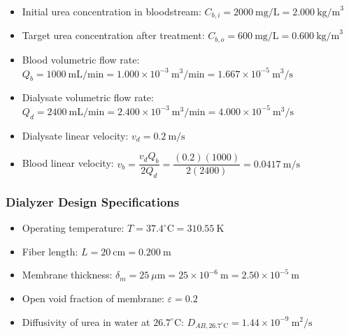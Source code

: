 \documentclass[10.5pt]{article}
\begin{document}
\vspace{-0.2cm}
\begin{itemize}
    \setlength\itemsep{-0.15cm}

    \item Initial urea concentration in bloodstream: 
    \(C_{b,i} = 2000 \ \text{mg/L} = 2.000 \ \text{kg/m}^3\)

    \item Target urea concentration after treatment: 
    \(C_{b,o} = 600 \ \text{mg/L} = 0.600 \ \text{kg/m}^3\)

    \item Blood volumetric flow rate: 
    \(Q_b = 1000 \ \text{mL/min} = 1.000 \times 10^{-3} \ \text{m}^3/\text{min}
    = 1.667 \times 10^{-5} \ \text{m}^3/\text{s}\)

    \item Dialysate volumetric flow rate: 
    \(Q_d = 2400 \ \text{mL/min} = 2.400 \times 10^{-3} \ \text{m}^3/\text{min}
    = 4.000 \times 10^{-5} \ \text{m}^3/\text{s}\)

    \item Dialysate linear velocity: 
    \(v_d = 0.2 \ \text{m/s}\)

    \item Blood linear velocity: 
    \(v_b = \dfrac{v_d Q_b}{2Q_d}
    = \dfrac{(0.2)(1000)}{2(2400)}
    = 0.0417 \ \text{m/s}\)
\end{itemize}

\vspace{-0.4cm}
\subsubsection{Dialyzer Design Specifications}

\vspace{-0.2cm}
\begin{itemize}
    \setlength\itemsep{-0.15cm}

    \item Operating temperature: 
    \(T = 37.4^\circ \text{C} = 310.55 \ \text{K}\)

    \item Fiber length: 
    \(L = 20 \ \text{cm} = 0.200 \ \text{m}\)

    \item Membrane thickness: 
    \(\delta_m = 25 \ \mu\text{m} = 25 \times 10^{-6} \ \text{m}
    = 2.50 \times 10^{-5} \ \text{m}\)

    \item Open void fraction of membrane: 
    \(\varepsilon = 0.2\)

    \item Diffusivity of urea in water at \(26.7^\circ \text{C}\): 
    \(D_{AB,26.7^\circ\text{C}} = 1.44 \times 10^{-9} \ \text{m}^2/\text{s}\)
\end{itemize}
\end{document}
